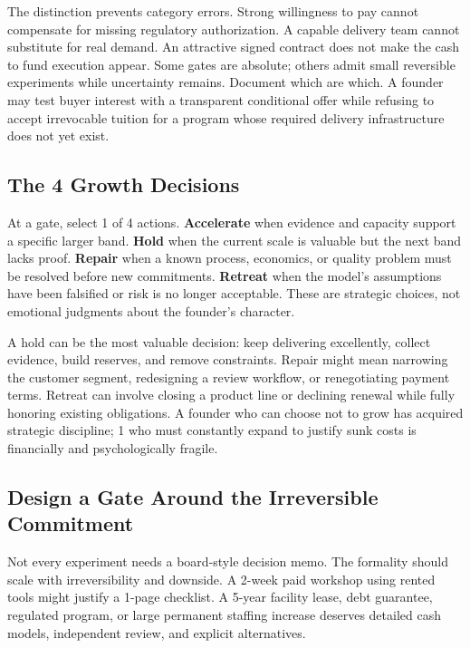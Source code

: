 The distinction prevents category errors. Strong willingness to pay cannot compensate for missing regulatory authorization. A capable delivery team cannot substitute for real demand. An attractive signed contract does not make the cash to fund execution appear. Some gates are absolute; others admit small reversible experiments while uncertainty remains. Document which are which. A founder may test buyer interest with a transparent conditional offer while refusing to accept irrevocable tuition for a program whose required delivery infrastructure does not yet exist.

\subsection{The 4 Growth Decisions}
\label{sec:four_growth_decisions}

At a gate, select 1 of 4 actions. \textbf{Accelerate} when evidence and capacity support a specific larger band. \textbf{Hold} when the current scale is valuable but the next band lacks proof. \textbf{Repair} when a known process, economics, or quality problem must be resolved before new commitments. \textbf{Retreat} when the model's assumptions have been falsified or risk is no longer acceptable. These are strategic choices, not emotional judgments about the founder's character.

A hold can be the most valuable decision: keep delivering excellently, collect evidence, build reserves, and remove constraints. Repair might mean narrowing the customer segment, redesigning a review workflow, or renegotiating payment terms. Retreat can involve closing a product line or declining renewal while fully honoring existing obligations. A founder who can choose not to grow has acquired strategic discipline; 1 who must constantly expand to justify sunk costs is financially and psychologically fragile.

\subsection{Design a Gate Around the Irreversible Commitment}
\label{sec:gate_around_irreversible_commitment}

Not every experiment needs a board-style decision memo. The formality should scale with irreversibility and downside. A 2-week paid workshop using rented tools might justify a 1-page checklist. A 5-year facility lease, debt guarantee, regulated program, or large permanent staffing increase deserves detailed cash models, independent review, and explicit alternatives.

